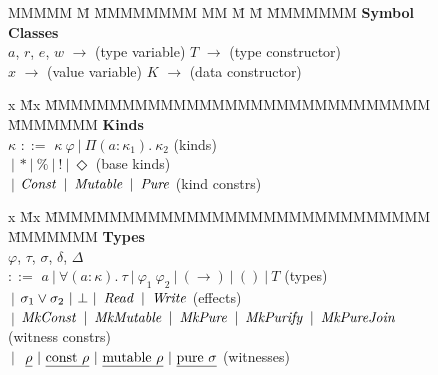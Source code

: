 \begin{figure}[ht]
\begin{flushleft}

\begin{tabbing}
MMMMM \= M \= MMMMMMMM
MM 	\= M \= M \= MMMMMMM \kill
\textbf{Symbol Classes} \\
	   $a$, $r$, $e$, $w$ 	\> $\rightarrow$ 	\>  (type variable)  
	\> $T$			\> $\rightarrow$	\>  (type constructor)
	\\
	   $x$			\> $\rightarrow$ 	\>  (value variable)  
	\> $K$			\> $\rightarrow$	\>  (data constructor)
\end{tabbing}


\begin{tabbing}
x 	\= Mx \= MMMMMMMMMMMMMMMMMMMMMMMMMMMMMM \= MMMMMMM \kill
\textbf{Kinds} \\
$\kappa$ 
	\> $::=$	\> $\kappa \ \varphi \ 
				| \ \Pi(a : \kappa_1) . \ \kappa_2$ 
			\> (kinds)
	\\
	\> $\ |$	\> $* \ 
				| \ \% \ 
				| \ ! \
				| \ \Diamond$ 
			\> (base kinds) \\
	\> $\ |$	\> $\iConst \ 
				| \ \iMutable \ 
				| \ \iPure$
			\> (kind constrs)
\end{tabbing}


\begin{tabbing}
x 	\= Mx \= MMMMMMMMMMMMMMMMMMMMMMMMMMMMMM \= MMMMMMM \kill
\textbf{Types} \\
$\varphi$, $\tau$, $\sigma$, $\delta$, $\Delta$ \\
	\> $::=$	\> $a \ 
				| \ \forall (a : \kappa). \ \tau \
				| \ \varphi_1 \ \varphi_2 \ 
				| \ (\to) \
				| \ () \
				| \ T$
			\> (types) 
	\\
	\> $\ |$	\> $\sigma_1 \lor \sigma_2 \ 
				| \ \bot \
				| \ \iRead \ 
				| \ \iWrite$
			\> (effects) 
	\\
	\> $\ |$ 	\> $\iMkConst \ 
				| \ \iMkMutable \
				| \ \iMkPure \ 
				| \ \iMkPurify \ 
				| \ \iMkPureJoin$ 
			\> (witness constrs)
	\\
	\> $\ |$	\> $ \ \un{\rho} \
				| \ \un{\rconst \ \rho} \
				| \ \un{\rmutable \ \rho} \ 
				| \ \un{\rpure \ \sigma}$
			\> (witnesses) 
\end{tabbing}


\end{flushleft}
\end{figure}
